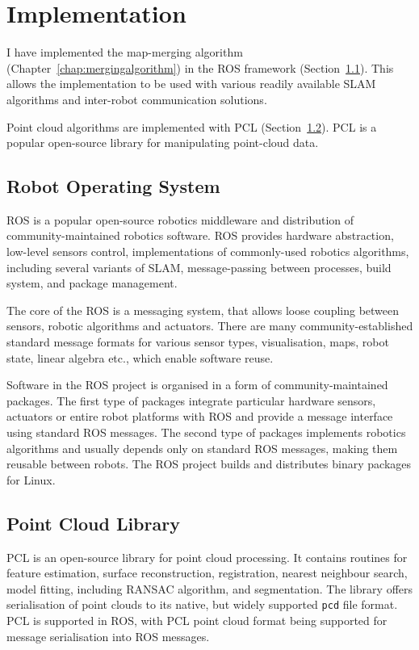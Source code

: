 \chapter{Implementation}
\label{chap:implementation}

I have implemented the map-merging algorithm (Chapter~\ref{chap:mergingalgorithm}) in the \gls{ROS} framework (Section~\ref{sec:ros}). This allows the implementation to be used with various readily available \gls{SLAM} algorithms and inter-robot communication solutions.

Point cloud algorithms are implemented with \gls{PCL} (Section~\ref{sec:pcl}). \gls{PCL} is a popular open-source library for manipulating point-cloud data.

\section{Robot Operating System}
\label{sec:ros}

\gls{ROS} is a popular open-source robotics middleware and distribution of community-maintained robotics software. \gls{ROS} provides hardware abstraction, low-level sensors control, implementations of commonly-used robotics algorithms, including several variants of \gls{SLAM}, message-passing between processes, build system, and package management.

The core of the \gls{ROS} is a messaging system, that allows loose coupling between sensors, robotic algorithms and actuators. There are many community-established standard message formats for various sensor types, visualisation, maps, robot state, linear algebra etc., which enable software reuse.

Software in the \gls{ROS} project is organised in a form of community-maintained packages. The first type of packages integrate particular hardware sensors, actuators or entire robot platforms with \gls{ROS} and provide a message interface using standard \gls{ROS} messages. The second type of packages implements robotics algorithms and usually depends only on standard \gls{ROS} messages, making them reusable between robots. The \gls{ROS} project builds and distributes binary packages for Linux.

\section{Point Cloud Library}
\label{sec:pcl}

\gls{PCL} is an open-source library for point cloud processing. It contains routines for feature estimation, surface reconstruction, registration, nearest neighbour search, model fitting, including \gls{RANSAC} algorithm, and segmentation. The library offers serialisation of point clouds to its native, but widely supported \texttt{pcd} file format. \Gls{PCL} is supported in \gls{ROS}, with \gls{PCL} point cloud format being supported for message serialisation into \gls{ROS} messages.

